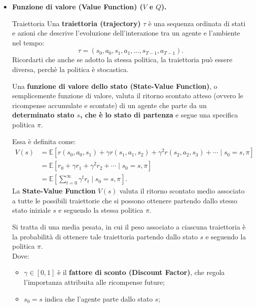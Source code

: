 \begin{itemize}
    \item \textbf{Funzione di valore (Value Function) ($V$ e $Q$).}

    \begin{definition}{Traiettoria}
        Una \textbf{traiettoria (trajectory)} $\tau$ è una sequenza
        ordinata di stati e azioni che descrive l'evoluzione
        dell'interazione tra un agente e l'ambiente nel tempo:
        \[
        \tau = (s_0,a_0,s_1,a_1,\ldots,s_{T-1},a_{T-1}).
        \]
        Ricordarti che anche se adotto la stessa politica, la traiettoria può essere diversa, perchè la politica è stocastica.
    \end{definition}

    Una \textbf{funzione di valore dello stato (State-Value Function)}, 
    o semplicemente funzione di valore, valuta il ritorno 
    scontato atteso (ovvero le ricompense accumulate e scontate) 
    di un agente che parte da un \textbf{determinato stato $s$, che è lo stato di partenza} e segue 
    una specifica politica $\pi$.

    Essa è definita come:
    \begin{align*}
        V(s)
        &= \mathbb{E}\left[
            r(s_0,a_0,s_1)
            + \gamma r(s_1,a_1,s_2)
            + \gamma^2 r(s_2,a_2,s_3)
            + \cdots
            \mid s_0=s,\pi
        \right] \\
        &= \mathbb{E}\left[
            r_0+\gamma r_1+\gamma^2r_2+\cdots
            \mid s_0=s,\pi
        \right] \\
        &= \mathbb{E}\left[
            \sum_{t=0}^{\infty}\gamma^t r_t
            \mid s_0=s,\pi
        \right].
    \end{align*}
    La \textbf{State-Value Function} $V(s)$ valuta il ritorno
scontato medio associato a tutte le possibili traiettorie
che si possono ottenere partendo dallo stesso stato iniziale
$s$ e seguendo la stessa politica $\pi$.

Si tratta di una media pesata, in cui il peso associato
a ciascuna traiettoria è la probabilità di ottenere tale
traiettoria partendo dallo stato $s$ e seguendo la politica $\pi$.
\\
    Dove:
    \begin{itemize}
        \item $\gamma \in [0,1]$ è il 
        \textbf{fattore di sconto (Discount Factor)}, 
        che regola l'importanza attribuita alle ricompense future;

        \item $s_0=s$ indica che l'agente parte dallo stato $s$;


\end{itemize}
\end{itemize}
